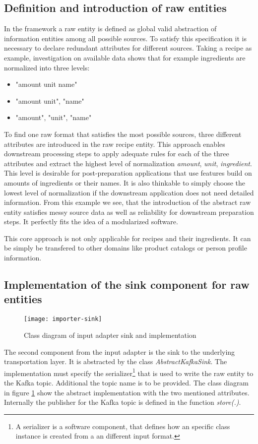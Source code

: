 \subsection{Definition and introduction of raw entities}
In the framework a raw entity is defined as global valid abstraction of information entities among all possible sources. To satisfy this specification it is necessary to declare redundant attributes for different sources. Taking a recipe as example, investigation on available data shows that for example ingredients are normalized into three levels:
\begin{itemize}
\item "amount unit name"
\item "amount unit", "name"
\item "amount", "unit", "name"
\end{itemize}
To find one raw format that satisfies the most possible sources, three different attributes are introduced in the raw recipe entity. This approach enables downstream processing steps to apply adequate rules for each of the three attributes and extract the highest level of normalization \textit{amount}, \textit{unit}, \textit{ingredient}. This level is desirable for post-preparation applications that use features build on amounts of ingredients or their names. It is also thinkable to simply choose the lowest level of normalization if the downstream application does not need detailed information. From this example we see, that the introduction of the abstract raw entity satisfies messy source data as well as reliability for downstream preparation steps. It perfectly fits the idea of a modularized software.

This core approach is not only applicable for recipes and their ingredients. It can be simply be transfered to other domains like product catalogs or person profile information.

\subsection{Implementation of the sink component for raw entities}

\begin{figure}[htb]
  \centering
  \texttt{[image: importer-sink]}\\
  \caption{Class diagram of input adapter sink and implementation}
  \label{fig:importer-sink}
\end{figure}

The second component from the input adapter is the sink to the underlying transportation layer. It is abstracted by the class \textit{AbstractKafkaSink}. The implementation must specify the serializer\footnote{A serializer is a software component, that defines how an specific class instance is created from a an different input format.} that is used to write the raw entity to the Kafka topic. Additional the topic name is to be provided. The class diagram in figure  \ref{fig:importer-sink} show the abstract implementation with the two mentioned attributes. Internally the publisher for the Kafka topic is defined in the function \textit{store(.)}.

